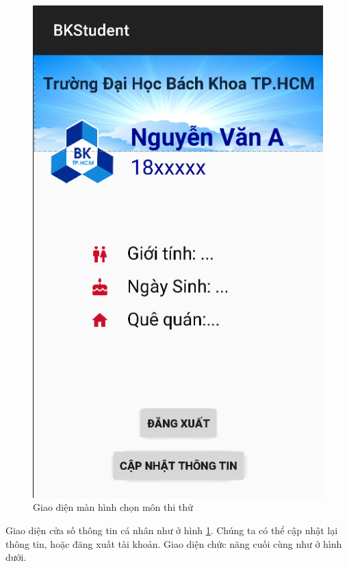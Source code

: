 \documentclass[a4paper]{article}
\begin{document}
\begin{figure}[H]
    \centering
    \includegraphics[scale=.4]{info_ui.png}
    \caption{Giao diện màn hình chọn môn thi thử}
    \label{fig:sel_info}
\end{figure}
Giao diện cửa số thông tin cá nhân như ở hình \ref{fig:sel_info}. Chúng ta có thể cập nhật lại thông tin, hoặc đăng xuất tài khoản. Giao diện chức năng cuối cùng như ở hình dưới.
\end{document}
